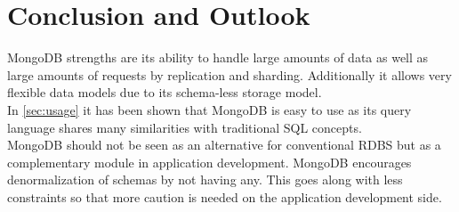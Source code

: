 \FloatBarrier

\newpage
\section{Conclusion and Outlook}
\label{sec:conclusion}

MongoDB strengths are its ability to handle large amounts of data as well as
large amounts of requests by replication and sharding. Additionally it allows
very flexible data models due to its schema-less storage model.\\
In \autoref{sec:usage} it has been shown that MongoDB is easy to use as its
query language shares many similarities with traditional SQL concepts.\\
MongoDB should not be seen as an alternative for conventional RDBS but as a
complementary module in application development. MongoDB encourages
denormalization of schemas by not having any. This goes along with less
constraints so that more caution is needed on the application development side.





